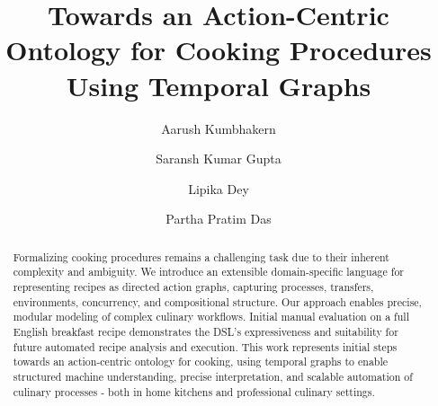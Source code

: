 \documentclass[sigconf]{acmart}
\begin{document}
\title{Towards an Action-Centric Ontology for Cooking Procedures Using Temporal Graphs}

\author{Aarush Kumbhakern}

\author{Saransh Kumar Gupta}
\authornotemark[1]
\authornotemark[2]

\author{Lipika Dey}
\authornotemark[2]

\author{Partha Pratim Das}


\renewcommand{\shortauthors}{Kumbhakern et al.}

\begin{abstract}
  Formalizing cooking procedures remains a challenging task due to their inherent complexity and ambiguity. We introduce an extensible domain-specific language for representing recipes as directed action graphs, capturing processes, transfers, environments, concurrency, and compositional structure. Our approach enables precise, modular modeling of complex culinary workflows. Initial manual evaluation on a full English breakfast recipe demonstrates the DSL’s expressiveness and suitability for future automated recipe analysis and execution. This work represents initial steps towards an action-centric ontology for cooking, using temporal graphs to enable structured machine understanding, precise interpretation, and scalable automation of culinary processes - both in home kitchens and professional culinary settings.
\end{abstract}
\end{document}
